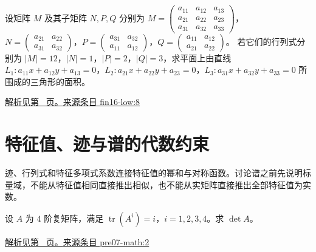 \documentclass[12pt,fontset=fandol]{ctexart}
\begin{document}
\begin{example}\label{ex:fin16-low:8}

设矩阵 $M$ 及其子矩阵 $N,P,Q$ 分别为
$M = \begin{pmatrix} a_{11} & a_{12} & a_{13} \\ a_{21} & a_{22} & a_{23} \\ a_{31} & a_{32} & a_{33} \end{pmatrix}$，$N = \begin{pmatrix} a_{21} & a_{22} \\ a_{31} & a_{32} \end{pmatrix}$，$P = \begin{pmatrix} a_{31} & a_{32} \\ a_{11} & a_{12} \end{pmatrix}$，$Q = \begin{pmatrix} a_{11} & a_{12} \\ a_{21} & a_{22} \end{pmatrix}$。
若它们的行列式分别为 $|M| = 12$，$|N| = 1$，$|P| = 2$，$|Q| = 3$，求平面上由直线 $L_1: a_{11}x + a_{12}y + a_{13} = 0$，$L_2: a_{21}x + a_{22}y + a_{23} = 0$，$L_3: a_{31}x + a_{32}y + a_{33} = 0$ 所围成的三角形的面积。

\par\hyperref[ans:fin16-low:8]{解析见第~\pageref{ans:fin16-low:8} 页。}\quad\href{https://github.com/lzxcr/cmc-mathematics/blob/64916fa1fdbc3e444a652eca204d5669058ee321/src/problems/finals/16/08.md}{来源条目 fin16-low:8}

\end{example}

\section{特征值、迹与谱的代数约束}

\label{sec:questions-3}

迹、行列式和特征多项式系数连接特征值的幂和与对称函数。讨论谱之前先说明标量域，不能从特征值相同直接推出相似，也不能从实矩阵直接推出全部特征值为实数。

\begin{example}\label{ex:pre07-math:2}

设 $A$ 为 $4$ 阶复矩阵，满足 $\operatorname{tr}(A^i)=i$，$i=1,2,3,4$。求 $\det A$。

\par\hyperref[ans:pre07-math:2]{解析见第~\pageref{ans:pre07-math:2} 页。}\quad\href{https://github.com/lzxcr/cmc-mathematics/blob/64916fa1fdbc3e444a652eca204d5669058ee321/src/problems/preliminary/07/02.md}{来源条目 pre07-math:2}

\end{example}
\end{document}

